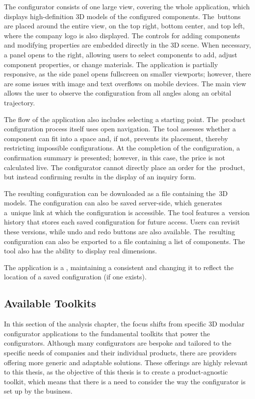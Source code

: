 The configurator consists of one large view, covering the whole application, which displays high-definition 3D models of the configured components. The~buttons are placed around the entire view, on the top right, bottom center, and top left, where the company logo is also displayed.  The controls for adding components and modifying properties are embedded directly in the 3D scene. When necessary, a panel opens to the right, allowing users to select components to add, adjust component properties, or change materials. The application is partially responsive, as the side panel opens fullscreen on smaller viewports; however, there are some issues with image and text overflows on mobile devices. The main view allows the user to observe the configuration from all angles along an orbital trajectory.

The flow of the application also includes selecting a starting point. The~product configuration process itself uses open navigation. The tool assesses whether a component can fit into a space and, if not, prevents its placement, thereby restricting impossible configurations. At the completion of the configuration, a confirmation summary is presented; however, in this case, the price is not calculated live. The configurator cannot directly place an order for the~product, but instead confirming results in the display of an inquiry form.

The resulting configuration can be downloaded as a file containing the~3D models. The configuration can also be saved server-side, which generates a~unique link at which the configuration is accessible. The tool features a~version history that stores each saved configuration for future access. Users can revisit these versions, while undo and redo buttons are also available. The~resulting configuration can also be exported to a  file containing a list of components. The tool also has the ability to display real dimensions.

The application is a , maintaining a consistent  and changing it to reflect the location of a saved configuration (if one exists).


\subsection{Available Toolkits}

In this section of the analysis chapter, the focus shifts from specific 3D modular configurator applications to the fundamental toolkits that power the configurators. Although many configurators are bespoke and tailored to the specific needs of companies and their individual products, there are providers offering more generic and adaptable solutions. These offerings are highly relevant to this thesis, as the objective of this thesis is to create a product-agnostic toolkit, which means that there is a need to consider the way the configurator is set up by the business.

